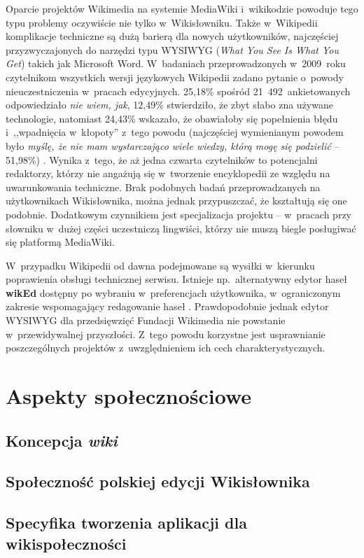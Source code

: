 \documentclass{pracamgr}
\begin{document}
Oparcie projektów Wikimedia na systemie MediaWiki i~wikikodzie powoduje tego typu problemy oczywiście nie tylko w~Wikisłowniku. Także w~Wikipedii komplikacje techniczne są dużą barierą dla nowych użytkowników, najczęściej przyzwyczajonych do narzędzi typu WYSIWYG (\emph{What You See Is What You Get}) takich jak Microsoft Word. W~badaniach przeprowadzonych w~2009~roku czytelnikom wszystkich wersji językowych Wikipedii zadano pytanie o~powody nieuczestniczenia w~pracach edycyjnych. 25,18\% spośród 21~492~ankietowanych odpowiedziało \emph{nie wiem, jak}, 12,49\% stwierdziło, że zbyt słabo zna używane technologie, natomiast 24,43\% wskazało, że obawiałoby się popełnienia błędu i~,,wpadnięcia w~kłopoty'' z~tego powodu (najczęściej wymienianym powodem było \emph{myślę, że nie mam wystarczająco wiele wiedzy, którą mogę się podzielić} -- 51,98\%) \cite{wiki:survey}.
Wynika z~tego, że aż jedna czwarta czytelników to potencjalni redaktorzy, którzy nie angażują się w~tworzenie encyklopedii ze względu na uwarunkowania techniczne. Brak podobnych badań przeprowadzanych na użytkownikach Wikisłownika, można jednak przypuszczać, że kształtują się one podobnie. Dodatkowym czynnikiem jest specjalizacja projektu -- w~pracach przy słowniku w~dużej części uczestniczą lingwiści, którzy nie muszą biegle posługiwać się platformą MediaWiki.

W~przypadku Wikipedii od dawna podejmowane są wysiłki w~kierunku poprawienia obsługi technicznej serwisu. Istnieje np.\ alternatywny edytor haseł \textbf{wikEd} dostępny po wybraniu w~preferencjach użytkownika, w~ograniczonym zakresie wspomagający redagowanie haseł \cite{wiki:wiked}.
Prawdopodobnie jednak edytor WYSIWYG dla przedsięwzięć Fundacji Wikimedia nie powstanie w~przewidywalnej przyszłości. Z~tego powodu korzystne jest usprawnianie poszczególnych projektów z~uwzględnieniem ich cech charakterystycznych.


\chapter{Aspekty społecznościowe}
\section{Koncepcja \emph{wiki}}
\section{Społeczność polskiej edycji Wikisłownika}
\label{sec:plsoc}

\section{Specyfika tworzenia aplikacji dla wikispołeczności}
\end{document}
